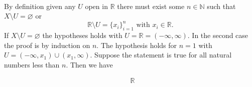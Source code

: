 \documentclass[11pt, oneside]{article}   	%
\begin{document}
\paragraph{}

By definition given any $U$ open in $\mathbb{R}$ there must exist some $n \in \mathbb{N}$ such that $X \setminus U = \varnothing$ or 
\[
\mathbb{R} \setminus U = \{x_i\}_{i=1}^n \text{ with } x_i \in \mathbb{R}.
\]
If $X \setminus U = \varnothing$ the hypotheses holds with $U = \mathbb{R} = (- \infty, \infty)$. In the second case the proof is by induction on $n$. The hypothesis holds for $n=1$ with $U = (- \infty, x_1) \cup (x_1, \infty)$. Suppose the statement is true for all natural numbers less than $n$. Then we have

\begin{eqnarray*}
&\mathbb{R}\
\end{eqnarray*}
\end{document}
